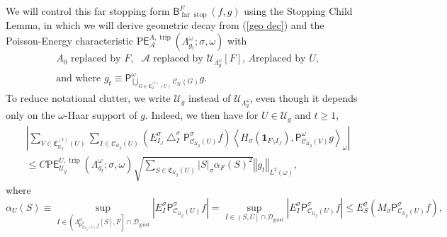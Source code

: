 \documentclass{amsart}%
\theoremstyle{plain}
\numberwithin{equation}{section}
\begin{document}
We will control this far stopping form $\mathsf{B}_{\operatorname{far}%
\operatorname*{stop}}^{F}\left(  f,g\right)  $ using the Stopping Child Lemma,
in which we will derive geometric decay from (\ref{geo dec}) and the
Poisson-Energy characteristic $\mathrm{P}\mathsf{E}_{\mathcal{A}%
}^{A,\operatorname*{trip}}\left(  \Lambda_{g_{t}}^{\omega};\sigma
,\omega\right)  $ with%
\begin{align*}
& A_{0}\text{ replaced by }F,\ \ \ \mathcal{A}\text{ replaced by }%
\mathcal{U}_{\Lambda_{g}^{\omega}}\left[  F\right]  \text{, \ \ }A\text{
replaced by }U,\\
& \text{and where }g_{t}\equiv\mathsf{P}_{\bigcup_{G\in\mathfrak{C}%
_{\mathcal{U}}^{\left(  t\right)  }\left(  U\right)  }\mathcal{C}%
_{\mathcal{U}}\left(  G\right)  }^{\omega}g.
\end{align*}
To reduce notational clutter, we write $\mathcal{U}_{g}$ instead of
$\mathcal{U}_{\Lambda_{g}^{\omega}}$, even though it depends only on the
$\omega$-Haar support of $g$. Indeed, we then have for $U\in\mathcal{U}_{g}$
and $t\geq1$,%
\begin{align*}
& \left\vert \sum_{V\in\mathfrak{C}_{\mathcal{U}_{g}}^{\left(  t\right)
}\left(  U\right)  }\sum_{I\in\mathcal{C}_{\mathcal{U}_{g}}\left(  U\right)
}\left(  E_{I_{J}}^{\sigma}\bigtriangleup_{I}^{\sigma}\mathsf{P}%
_{\mathcal{C}_{\mathcal{U}_{g}}\left(  U\right)  }^{\sigma}f\right)
\left\langle H_{\sigma}\left(  \mathbf{1}_{F\setminus I_{J}}\right)
,\mathsf{P}_{\mathcal{C}_{\mathcal{U}_{g}}\left(  V\right)  }^{\omega
}g\right\rangle _{\omega}\right\vert \\
& \leq C\mathrm{P}\mathsf{E}_{\mathcal{U}_{g}}^{U,\operatorname*{trip}}\left(
\Lambda_{g_{t}}^{\omega};\sigma,\omega\right)  \sqrt{\sum_{S\in\mathfrak{C}%
_{\mathcal{U}_{g}}\left(  U\right)  }\left\vert S\right\vert _{\sigma}%
\alpha_{F}\left(  S\right)  ^{2}}\left\Vert g_{t}\right\Vert _{L^{2}\left(
\omega\right)  },
\end{align*}
where%
\[
\alpha_{U}\left(  S\right)  \equiv\sup_{I\in\left(  \Lambda_{\mathsf{P}%
_{\mathcal{C}_{\mathcal{U}_{g}}\left(  U\right)  }^{\sigma}f}^{\sigma}\left[
S\right]  ,F\right]  \cap\mathcal{D}_{\operatorname{good}}}\left\vert
E_{I}^{\sigma}\mathsf{P}_{\mathcal{C}_{\mathcal{U}_{g}}\left(  U\right)
}^{\sigma}f\right\vert =\sup_{I\in\left(  S,U\right]  \cap\mathcal{D}%
_{\operatorname{good}}}\left\vert E_{I}^{\sigma}\mathsf{P}_{\mathcal{C}%
_{\mathcal{U}_{g}}\left(  U\right)  }^{\sigma}f\right\vert \leq E_{S}^{\sigma
}\left(  M_{\sigma}\mathsf{P}_{\mathcal{C}_{\mathcal{U}_{g}}\left(  U\right)
}^{\sigma}f\right)  ,
\]
\end{document}
